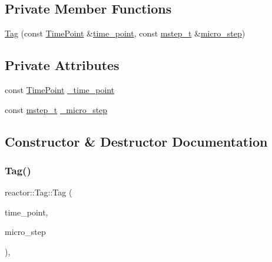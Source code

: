 \subsection*{Private Member Functions}
\begin{DoxyCompactItemize}
\item 
\hyperlink{classreactor_1_1Tag_ae9912e50f1398a241205e8fae7ad9cea}{Tag} (const \hyperlink{namespacereactor_ad950f8d1a46612500286a4af0f167080}{Time\+Point} \&\hyperlink{classreactor_1_1Tag_a25ec5662af4fc8c9b34cf5cc0d70b569}{time\+\_\+point}, const \hyperlink{namespacereactor_aaea1189d617982457b74127ba74a7340}{mstep\+\_\+t} \&\hyperlink{classreactor_1_1Tag_a8cfdeeb03c2e48a684e1bc517505c087}{micro\+\_\+step})
\end{DoxyCompactItemize}
\subsection*{Private Attributes}
\begin{DoxyCompactItemize}
\item 
const \hyperlink{namespacereactor_ad950f8d1a46612500286a4af0f167080}{Time\+Point} \hyperlink{classreactor_1_1Tag_a24a75e25cfaac63128d8f925ee95c4d9}{\+\_\+time\+\_\+point}
\item 
const \hyperlink{namespacereactor_aaea1189d617982457b74127ba74a7340}{mstep\+\_\+t} \hyperlink{classreactor_1_1Tag_a7660e5c962c9916a04abe97fad3226ab}{\+\_\+micro\+\_\+step}
\end{DoxyCompactItemize}


\subsection{Constructor \& Destructor Documentation}
\mbox{\label{classreactor_1_1Tag_ae9912e50f1398a241205e8fae7ad9cea}} 
\subsubsection{\texorpdfstring{Tag()}{Tag()}\hspace{0.1cm}{\footnotesize\ttfamily [1/4]}}
{\footnotesize\ttfamily reactor\+::\+Tag\+::\+Tag (\begin{DoxyParamCaption}\item[{const \hyperlink{namespacereactor_ad950f8d1a46612500286a4af0f167080}{Time\+Point} \&}]{time\+\_\+point,  }\item[{const \hyperlink{namespacereactor_aaea1189d617982457b74127ba74a7340}{mstep\+\_\+t} \&}]{micro\+\_\+step }\end{DoxyParamCaption})\hspace{0.3cm}{\ttfamily [inline]}, {\ttfamily [private]}}

